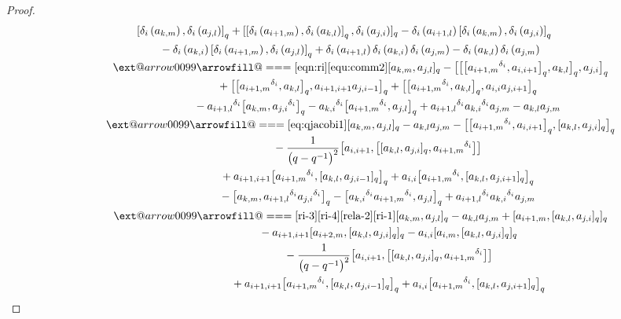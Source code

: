 \documentclass[10pt,a4paper]{amsart}
\makeatletter
\def\x@arrow{\DOTSB\Relbar}
\def\xlongequalsignfill@{\arrowfill@\x@arrow\Relbar\x@arrow}
\providecommand{\xlongequal}[2][]{%
	\ext@arrow 0099\xlongequalsignfill@{#1}{#2}}
\numberwithin{equation}{section}
\def\lr#1{\left[#1\right]}
\def\lrb#1{\left(#1\right)}
\def\d{\delta}
\makeatother
\begin{document}
\begin{proof}
\begin{gather*}
 \lr{\d_i\lrb{a_{k,m}},\d_i\lrb{a_{j,l}}}_q +[\lr{\d_i\lrb{a_{i+1,m}},\d_i\lrb{a_{k,l}}}_q,\d_i\lrb{a_{j,i}}]_q -\d_i\lrb{a_{i+1,l}}\lr{\d_i\lrb{a_{k,m}},\d_i\lrb{a_{j,i}}}_q\\
 \quad {}-\d_i\lrb{a_{k,i}}\lr{\d_i\lrb{a_{i+1,m}},\d_i\lrb{a_{j,l}}}_q +\d_i\lrb{a_{i+1,l}}\d_i\lrb{a_{k,i}}\d_i\lrb{a_{j,m}}-\d_i\lrb{a_{k,l}}\d_i\lrb{a_{j,m}} \\[-0.5mm]
\quad\qquad\xlongequal[\eqref{eqn:ri}]{\eqref{equ:comm2}} [a_{k,m},a_{j,l} ]_q
- \bigl[ \bigl[ \bigl[{a_{i+1,m}}^{\d_i} ,a_{i,i+1} \bigr]_q,a_{k,l} \bigr]_q ,a_{j,i} \bigr]_q
\\[-0.5mm]
 \quad\qquad\qquad\quad {}+ \bigl[ \bigl[{a_{i+1,m}}^{\d_i} ,a_{k,l} \bigr]_q, a_{i+1,i+1}a_{j,i-1} \bigr]_q+ \bigl[ \bigl[{a_{i+1,m}}^{\d_i} ,a_{k,l} \bigr]_q, a_{i,i}a_{j,i+1} \bigr]_q
\\
 \quad\qquad\qquad\quad {}-{a_{i+1,l}}^{\d_i} \bigl[a_{k,m},{a_{j,i}}^{\d_i} \bigr]_q -{a_{k,i}}^{\d_i} \bigl[{a_{i+1,m}}^{\d_i} ,a_{j,l} \bigr]_q +{a_{i+1,l}}^{\d_i} {a_{k,i}}^{\d_i} a_{j,m}-a_{k,l}a_{j,m}\\[-0.5mm]
\quad\qquad \xlongequal{\eqref{eq:qjacobi1}} [a_{k,m},a_{j,l} ]_q-a_{k,l}a_{j,m} - \bigl[ \bigl[{a_{i+1,m}}^{\d_i} ,a_{i,i+1} \bigr]_q, [a_{k,l},a_{j,i} ]_q \bigr]_q\\[-0.5mm]
\quad\qquad\qquad \quad {}-\frac{1}{\bigl(q-q^{-1}\bigr)^2} \bigl[a_{i,i+1}, \bigl[ [a_{k,l},a_{j,i} ]_q, {a_{i+1,m}}^{\d_i} \bigr] \bigr] \\
 \quad\qquad\qquad\quad {}+a_{i+1,i+1} \bigl[{a_{i+1,m}}^{\d_i}, [a_{k,l},a_{j,i-1} ]_q \bigr]_q +a_{i,i} \bigl[{a_{i+1,m}}^{\d_i} , [a_{k,l},a_{j,i+1} ]_q \bigr]_q \\
\quad\qquad\qquad \quad {}- \bigl[a_{k,m},{a_{i+1,l}}^{\d_i} {a_{j,i}}^{\d_i} \bigr]_q - \bigl[{a_{k,i}}^{\d_i} {a_{i+1,m}}^{\d_i} ,a_{j,l} \bigr]_q +{a_{i+1,l}}^{\d_i} {a_{k,i}}^{\d_i} a_{j,m}\\
\quad\qquad \xlongequal[\eqref{ri-3}\eqref{ri-4}]{\eqref{rela-2}\eqref{ri-1}} [a_{k,m},a_{j,l} ]_q -a_{k,l}a_{j,m} + [a_{i+1,m}, [a_{k,l},a_{j,i} ]_q ]_q \\
\quad\qquad\qquad \qquad\quad {}-a_{i+1,i+1} [a_{i+2,m}, [a_{k,l},a_{j,i} ]_q ]_q -a_{i,i} [a_{i,m}, [a_{k,l},a_{j,i} ]_q ]_q\\
 \quad\qquad\qquad\qquad\quad {}-\frac{1}{\bigl(q-q^{-1}\bigr)^2} \bigl[a_{i,i+1}, \bigl[ [a_{k,l},a_{j,i} ]_q, {a_{i+1,m}}^{\d_i} \bigr] \bigr]\\
 \quad\qquad\qquad\qquad\quad {}+a_{i+1,i+1} \bigl[{a_{i+1,m}}^{\d_i} , [a_{k,l},a_{j,i-1} ]_q \bigr]_q+a_{i,i} \bigl[{a_{i+1,m}}^{\d_i} , [a_{k,l},a_{j,i+1} ]_q \bigr]_q\\

\end{gather*}
\end{proof}
\end{document}
